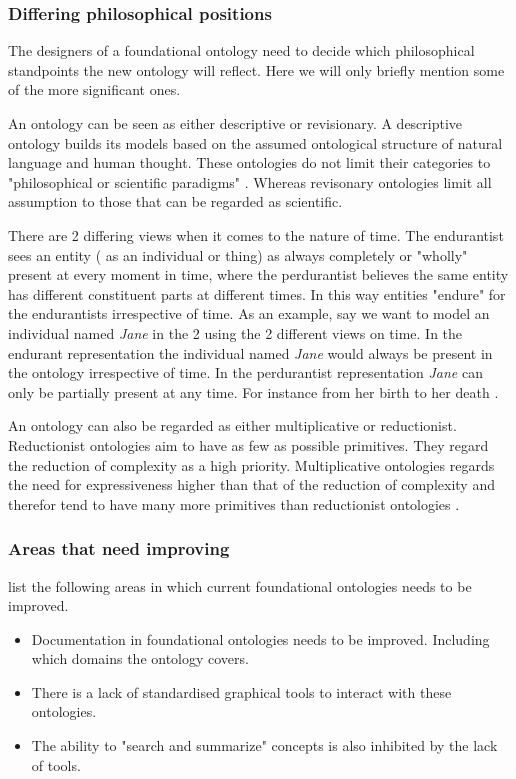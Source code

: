 \documentclass[12pt,a4paper]{article}
\begin{document}
\subsubsection{Differing philosophical positions}

The designers of a foundational ontology need to decide which philosophical standpoints the new ontology will reflect. Here we will only briefly mention some of the more significant ones.  

An ontology can be seen as either descriptive or revisionary. A descriptive ontology builds its models based on the assumed ontological structure of natural language and human thought. These ontologies do not limit their categories to "philosophical or scientific paradigms" \citep{Masolo2003}. Whereas revisonary ontologies limit all assumption to those that can be regarded as scientific.

There are 2 differing views when it comes to the nature of time. The endurantist sees an entity ( as an individual or thing) as always completely or "wholly" present at every moment in time, where the perdurantist believes the same entity has different constituent parts at different times\citep{dolce}. In this way entities "endure" for the endurantists irrespective of time. As an example, say we want to model an individual named \emph{Jane} in the 2 using the 2 different views on time. In the endurant representation the individual named \emph{Jane} would always be present in the ontology irrespective of time. In the perdurantist representation \emph{Jane} can only be partially present at any time. For instance from her birth to her death \citep{DeCesare}. 

An ontology can also be regarded as either multiplicative or reductionist. Reductionist ontologies aim to have as few as possible primitives. They regard the reduction of complexity as a high priority. Multiplicative ontologies regards the need for expressiveness higher than that of the reduction of complexity and therefor tend to have many more primitives than reductionist ontologies \citep{Masolo2003}. 

\subsubsection{Areas that need improving}

\cite{Conesa2010} list the following areas in which current foundational ontologies needs to be improved.
\begin{itemize}
\item Documentation in foundational ontologies needs to be improved. Including which domains the ontology covers.
\item There is a lack of standardised graphical tools to interact with these ontologies.
\item The ability to "search and summarize" concepts is also inhibited by the lack of tools.
\end{itemize}
\end{document}
